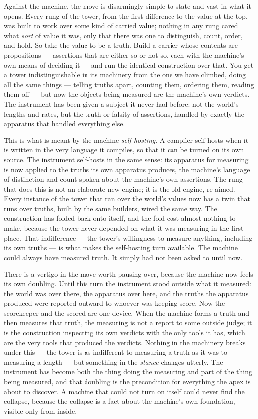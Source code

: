 Against the machine, the move is disarmingly simple to state and vast in what it opens. Every rung of the tower,
from the first difference to the value at the top, was built to work over some kind of carried value; nothing in
any rung cared what \emph{sort} of value it was, only that there was one to distinguish, count, order, and hold.
So take the value to be a truth. Build a carrier whose contents are propositions --- assertions that are either so or
not so, each with the machine's own means of deciding it --- and run the identical construction over that. You get
a tower indistinguishable in its machinery from the one we have climbed, doing all the same things --- telling
truths apart, counting them, ordering them, reading them off --- but now the objects being measured are the
machine's own verdicts. The instrument has been given a subject it never had before: not the world's lengths and
rates, but the truth or falsity of assertions, handled by exactly the apparatus that handled everything else.

This is what is meant by the machine \emph{self-hosting}. A compiler self-hosts when it is written in the very
language it compiles, so that it can be turned on its own source. The instrument self-hosts in the same sense: its
apparatus for measuring is now applied to the truths its own apparatus produces, the machine's language of
distinction and count spoken about the machine's own assertions. The rung that does this is not an elaborate new
engine; it is the old engine, re-aimed. Every instance of the tower that ran over the world's values now has a
twin that runs over truths, built by the same builders, wired the same way. The construction has folded back onto
itself, and the fold cost almost nothing to make, because the tower never depended on what it was measuring in the
first place. That indifference --- the tower's willingness to measure anything, including its own truths --- is
what makes the self-hosting turn available. The machine could always have measured truth. It simply had not been
asked to until now.

There is a vertigo in the move worth pausing over, because the machine now feels its own doubling. Until this
turn the instrument stood outside what it measured: the world was over there, the apparatus over here, and the
truths the apparatus produced were reported outward to whoever was keeping score. Now the scorekeeper and the
scored are one device. When the machine forms a truth and then measures that truth, the
measuring is not a report to some outside judge; it is the construction inspecting its own verdicts with the only
tools it has, which are the very tools that produced the verdicts. Nothing in the machinery breaks under this ---
the tower is as indifferent to measuring a truth as it was to measuring a length --- but something in the
\emph{stance} changes utterly. The instrument has become both the thing doing the measuring and part of the thing
being measured, and that doubling is the precondition for everything the apex is about to discover. A machine that
could not turn on itself could never find the collapse, because the collapse is a fact about the machine's own
foundation, visible only from inside.

